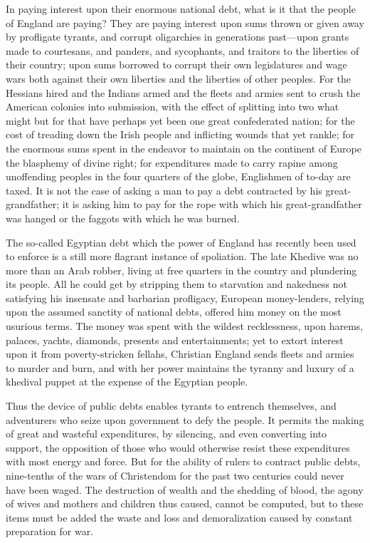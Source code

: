 \documentclass{book}
\begin{document}
In paying interest upon their enormous national debt, what is it that the people of England are paying? They are paying interest upon sums thrown or given away by profligate tyrants, and corrupt oligarchies in generations past—upon grants made to courtesans, and panders, and sycophants, and traitors to the liberties of their country; upon sums borrowed to corrupt their own legislatures and wage wars both against their own liberties and the liberties of other peoples. For the Hessians hired and the Indians armed and the fleets and armies sent to crush the American colonies into submission, with the effect of splitting into two what might but for that have perhaps yet been one great confederated nation; for the cost of treading down the Irish people and inflicting wounds that yet rankle; for the enormous sums spent in the endeavor to maintain on the continent of Europe the blasphemy of divine right; for expenditures made to carry rapine among unoffending peoples in the four quarters of the globe, Englishmen of to-day are taxed. It is not the case of asking a man to pay a debt contracted by his great-grandfather; it is asking him to pay for the rope with which his great-grandfather was hanged or the faggots with which he was burned.

The so-called Egyptian debt which the power of England has recently been used to enforce is a still more flagrant instance of spoliation. The late Khedive was no more than an Arab robber, living at free quarters in the country and plundering its people. All he could get by stripping them to starvation and nakedness not satisfying his insensate and barbarian profligacy, European money-lenders, relying upon the assumed sanctity of national debts, offered him money on the most usurious terms. The money was spent with the wildest recklessness, upon harems, palaces, yachts, diamonds, presents and entertainments; yet to extort interest upon it from poverty-stricken fellahs, Christian England sends fleets and armies to murder and burn, and with her power maintains the tyranny and luxury of a khedival puppet at the expense of the Egyptian people.

Thus the device of public debts enables tyrants to entrench themselves, and adventurers who seize upon government to defy the people. It permits the making of great and wasteful expenditures, by silencing, and even converting into support, the opposition of those who would otherwise resist these expenditures with most energy and force. But for the ability of rulers to contract public debts, nine-tenths of the wars of Christendom for the past two centuries could never have been waged. The destruction of wealth and the shedding of blood, the agony of wives and mothers and children thus caused, cannot be computed, but to these items must be added the waste and loss and demoralization caused by constant preparation for war.
\end{document}
